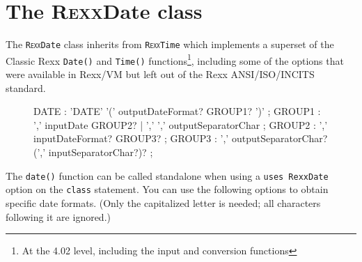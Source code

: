 \section{The R\textsc{exx}Date class}\label{refrexxdate}
 
The \texttt{R\textsc{exx}Date} class inherits from
\texttt{R\textsc{exx}Time} which implements a superset of the Classic
Rexx \texttt{Date()} and \texttt{Time()} functions\footnote{At the
  4.02 level, including the input and conversion functions}, including
some of the options that were available in Rexx/VM but left out of the
Rexx ANSI/ISO/INCITS standard.

\begin{figure}[h]
  \begin{shaded}
\begin{rail}
  DATE : 'DATE' '('   outputDateFormat? GROUP1?  ')'
  ;
  GROUP1 : ','  inputDate GROUP2?
  | ','  ','  outputSeparatorChar
  ;
  GROUP2 : ','  inputDateFormat? GROUP3?
  ;
  GROUP3 : ','  outputSeparatorChar? (',' inputSeparatorChar?)?
  ;
  
\end{rail}
\end{shaded}
\end{figure}

The \texttt{date()} function can be called standalone when using a \texttt{uses RexxDate} option on the \texttt{class} statement. You can use the following options to obtain specific date formats. (Only the capitalized letter is needed; all characters following it are ignored.)
